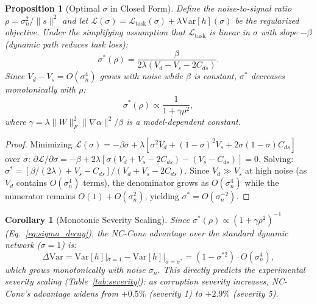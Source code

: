 \documentclass[journal]{IEEEtran}
\newtheorem{proposition}{Proposition}
\newtheorem{corollary}{Corollary}
\begin{document}
\begin{proposition}[Optimal $\sigma$ in Closed Form]
\label{prop:optimal_sigma}
Define the noise-to-signal ratio $\rho = \sigma_n^2 / \|s\|^2$ and let $\mathcal{L}(\sigma) = \mathcal{L}_{\text{task}}(\sigma) + \lambda \text{Var}[h](\sigma)$ be the regularized objective.
Under the simplifying assumption that $\mathcal{L}_{\text{task}}$ is linear in $\sigma$ with slope $-\beta$ (dynamic path reduces task loss):
\begin{equation}
\sigma^*(\rho) = \frac{\beta}{2\lambda(V_d - V_s - 2C_{ds})}.
\label{eq:sigma_star}
\end{equation}
Since $V_d - V_s = O(\sigma_n^4)$ grows with noise while $\beta$ is constant, $\sigma^*$ decreases monotonically with $\rho$:
\begin{equation}
\sigma^*(\rho) \propto \frac{1}{1 + \gamma \rho^2},
\label{eq:sigma_decay}
\end{equation}
where $\gamma = \lambda \|W\|_F^2 \|\nabla\alpha\|^2 / \beta$ is a model-dependent constant.
\end{proposition}

\begin{proof}
Minimizing $\mathcal{L}(\sigma) = -\beta\sigma + \lambda[\sigma^2 V_d + (1{-}\sigma)^2 V_s + 2\sigma(1{-}\sigma)C_{ds}]$ over $\sigma$:
$\partial \mathcal{L}/\partial \sigma = -\beta + 2\lambda[\sigma(V_d + V_s - 2C_{ds}) - (V_s - C_{ds})] = 0$.
Solving: $\sigma^* = [\beta/(2\lambda) + V_s - C_{ds}] / (V_d + V_s - 2C_{ds})$.
Since $V_d \gg V_s$ at high noise (as $V_d$ contains $O(\sigma_n^4)$ terms), the denominator grows as $O(\sigma_n^4)$ while the numerator remains $O(1) + O(\sigma_n^2)$, yielding $\sigma^* = O(\sigma_n^{-2})$.
\end{proof}

\begin{corollary}[Monotonic Severity Scaling]
\label{cor:severity}
Since $\sigma^*(\rho) \propto (1 + \gamma\rho^2)^{-1}$ (Eq.~\ref{eq:sigma_decay}), the NC-Conv advantage over the standard dynamic network ($\sigma{=}1$) is:
\begin{equation}
\Delta\text{Var} = \text{Var}[h]|_{\sigma=1} - \text{Var}[h]|_{\sigma=\sigma^*} = (1 - \sigma^{*2}) \cdot O(\sigma_n^4),
\end{equation}
which grows monotonically with noise $\sigma_n$.
This directly predicts the experimental severity scaling (Table~\ref{tab:severity}): as corruption severity increases, NC-Conv's advantage widens from $+0.5\%$ (severity 1) to $+2.9\%$ (severity 5).
\end{corollary}
\end{document}
